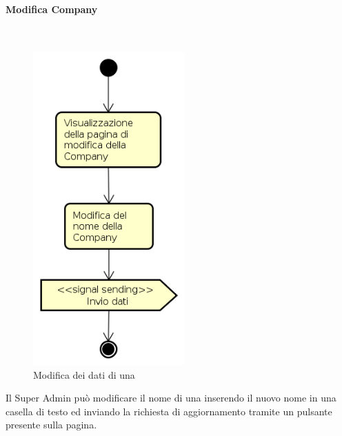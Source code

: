 \paragraph{Modifica Company} \mbox{} \\
\begin{figure}[H]
\begin{center}
\includegraphics[height=12cm]{res/sections/backend/activities/modificaCompanySA.png}
\caption{Modifica dei dati di una }
\end{center}
\end{figure}
Il Super Admin può modificare il nome di una  inserendo il nuovo nome in una casella di testo ed inviando la richiesta di aggiornamento tramite un pulsante presente sulla pagina.
\newpage
